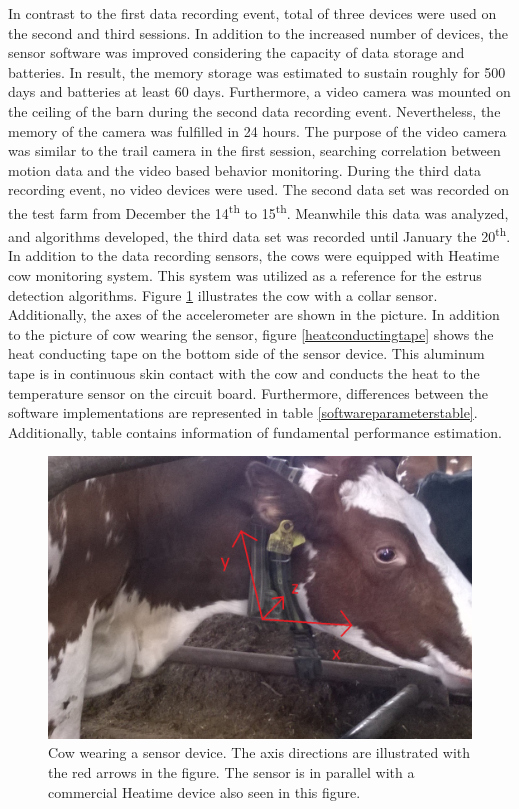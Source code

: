 \documentclass[english,12pt,a4paper,pdftex,elec,utf8]{aaltothesis}
\begin{document}
In contrast to the first data recording event, total of three devices were used on the second and third sessions. In addition to the increased number of devices, the sensor software was improved considering the capacity of data storage and batteries. In result, the memory storage was estimated to sustain roughly for 500 days and batteries at least 60 days. Furthermore, a video camera was mounted on the ceiling of the barn during the second data recording event. Nevertheless, the memory of the camera was fulfilled in 24 hours. The purpose of the video camera was similar to the trail camera in the first session, searching correlation between motion data and the video based behavior monitoring. During the third data recording event, no video devices were used. The second data set was recorded on the test farm from December the 14\textsuperscript{th} to 15\textsuperscript{th}. Meanwhile this data was analyzed, and algorithms developed, the third data set was recorded until January the 20\textsuperscript{th}. In addition to the data recording sensors, the cows were equipped with Heatime cow monitoring system. This system was utilized as a reference for the estrus detection algorithms. Figure \ref{sensorikaulassakuva} illustrates the cow with a collar sensor. Additionally, the axes of the accelerometer are shown in the picture. In addition to the picture of cow wearing the sensor, figure \ref{heatconductingtape} shows the heat conducting tape on the bottom side of the sensor device. This aluminum tape is in continuous skin contact with the cow and conducts the heat to the temperature sensor on the circuit board. Furthermore, differences between the software implementations are represented in table \ref{softwareparameterstable}. Additionally, table contains information of fundamental performance estimation.



\begin{figure}[thb]
\centering
\includegraphics[width = 0.75 \textwidth]{figures/sensorikaulassa1.png}
\caption{Cow wearing a sensor device. The axis directions are illustrated with the red arrows in the figure. The sensor is in parallel with a commercial Heatime device also seen in this figure.}\label{sensorikaulassakuva}
\end{figure}
\end{document}
